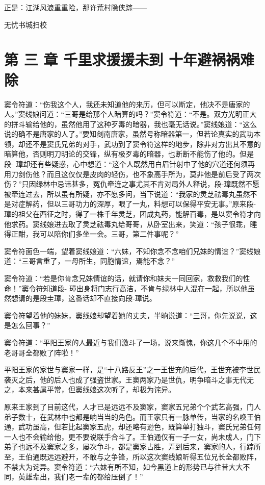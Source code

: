 \documentclass[12pt,oneside]{book}
\begin{document}
正是：江湖风浪重重险，那许荒村隐侠踪------

无忧书城扫校

\chapter{第 三 章 千里求援援未到
十年避祸祸难除}\label{ux7b2c-ux4e09-ux7ae0-ux5343ux91ccux6c42ux63f4ux63f4ux672aux5230-ux5341ux5e74ux907fux7978ux7978ux96beux9664}

窦令符道：``伤我这个人，我还未知道他的来历，但可以断定，他决不是唐家的人。''窦线娘问道：``三哥是给那个人暗算的吗？''窦令符道：``不是。双方光明正大的拼斗输给他的，虽然他用了这种歹毒的暗器，我也毫无话说。''窦线娘道：``这么说的确不是唐家的人了。''要知剑南唐家，虽然号称暗器第一，但若论真实的武功本领，却还不是窦氏兄弟的对手，武功到了窦令符这样的地步，除非对方出其不意的暗算他，否则明刀明论的交锋，纵有极歹毒的暗器，也断断不能伤了他的。但是段-
璋却还有些疑惑，心中想道：``这个人既然用白眉针射中了他的穴道还何须再用刀剑伤他？而且这仅仅是皮肉的轻伤，也不象高手所为，莫非他是前后受了两次伤？''只因绿林中忌讳甚多，冤仇牵连之事尤其不肯对局外人释说，段-璋既然不愿被牵连过去，所以虽有所疑，亦不愿多问，当下说道：``我家的灵芝祛毒丸虽然不是对症解药，但以三哥功力的深厚，眼了一丸，料想可以保得平安无事。''原来段-
璋的祖父在西征之时，得了一株千年灵芝，团成丸药，能解百毒，是以窦令符才向他求药。窦线娘进去取了灵芝祛毒丸给哥哥，从卧室出来，笑道：``孩子很乖，睡得正酣，我可以陪你们多坐一会。三哥，第二件事呢？''

窦令符面色一端，望着窦线娘道：``六妹，不知你念不念咱们兄妹的情谊？''窦线娘道：``三哥言重了，一母所生，同胞情谊，焉能不念？''

窦令符道：``若是你肯念兄妹情谊的话，就请你和妹夫一同回家，救救我们的性命！''窦令符知道段-
璋出身将门志行高洁，不肯与绿林中人混在一起，所以他虽然想请的是段圭璋，这番话却不直接向段-璋说。

窦令符望着他的妹妹，窦线娘却望着她的丈夫，半晌说道：``三哥，你先说说，这是怎么回事？''

窦令符道：``平阳王家的人最近与我们激斗了一场，说来惭愧，你这几个不中用的老哥哥全都败了阵啦！''

平阳王家的家世与窦家一样，是``十八路反王''之一王世充的后代，王世充被李世民袭灭之后，他的后人也成了强盗世家。王窦两家乃是世仇，明争暗斗之事无代无之，本来甚属平常，但窦线娘这次听了，却极为诧异。

原来王家到了目前这代，人才已是远远不及窦家，窦家五兄弟个个武艺高强，门人弟子数十，在武林中也都是响当当的角色。而王家只有一脉单传，当家的名唤王伯通，武功虽高，但若比起窦家五虎，却还略有逊色，既算单打独斗，窦氏兄弟任何一人也不会输给他，更不要说联手合斗了。王伯通仅有一子一女，尚未成人，门下弟子也远不及窦家之多，屡次争斗，都是窦家占胜，弄到后来，窦家的人，行踪所至，王伯通既远远避开，不敢与之争锋，所以这次窦线娘听得五位兄长全都败阵，不禁大为诧异。窦令符道：``六妹有所不知，如今黑道上的形势已与往昔大大不同，英雄辈出，我们老一辈的都给压倒了！''
\end{document}
